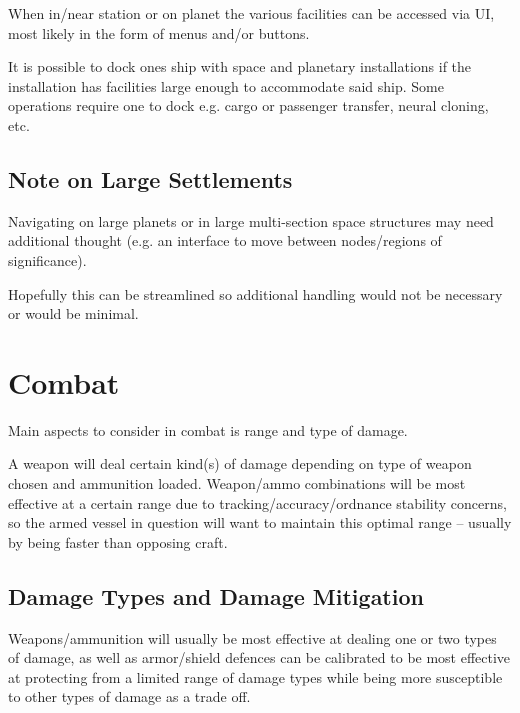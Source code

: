 \documentclass[a4paper,10pt]{article}
\begin{document}
\begin{multicols}{2}
When in/near station or on planet the various facilities can be accessed via
UI, most likely in the form of menus and/or buttons.

It is possible to dock ones ship with space and planetary installations if the
installation has facilities large enough to accommodate said ship. Some
operations require one to dock e.g. cargo or passenger transfer, neural
cloning, etc.

\subsection{Note on Large Settlements}
Navigating on large planets or in large multi-section space structures may
need additional thought (e.g. an interface to move between nodes/regions of
significance).

Hopefully this can be streamlined so additional handling would not be necessary
or would be minimal.

\end{multicols}


\section{Combat}
\begin{multicols}{2}
Main aspects to consider in combat is range and type of damage.

A weapon will deal certain kind(s) of damage depending on type of weapon chosen
and ammunition loaded. Weapon/ammo combinations will be most effective at a
certain range due to tracking/accuracy/ordnance stability concerns, so the armed
vessel in question will want to maintain this optimal range -- usually by being
faster than opposing craft.

\subsection{Damage Types and Damage Mitigation}
Weapons/ammunition will usually be most effective at dealing one or two types
of damage, as well as armor/shield defences can be calibrated to be most
effective at protecting from a limited range of damage types while being more
susceptible to other types of damage as a trade off.
\end{multicols}
\end{document}
